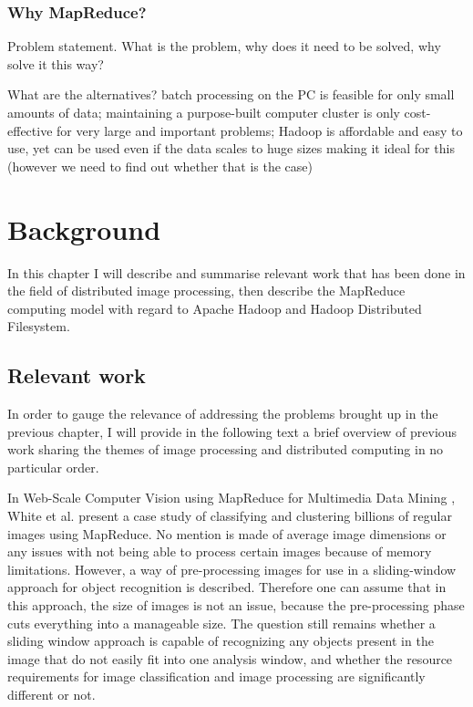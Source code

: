 \documentclass [12pt,a4paper]{report}
\begin{document}

\subsection{Why MapReduce?}

Problem statement. What is the problem, why does it need to be solved, why solve it this way? 

What are the alternatives? batch processing on the PC is feasible for only small amounts of data; maintaining a purpose-built computer cluster is only cost-effective for very large and important problems; Hadoop is affordable and easy to use, yet can be used even if the data scales to huge sizes making it ideal for this (however we need to find out whether that is the case)


\chapter{Background}

In this chapter I will describe and summarise relevant work that has been done in the field of distributed image processing, then describe the MapReduce computing model with regard to Apache Hadoop and Hadoop Distributed Filesystem.

\section{Relevant work}

In order to gauge the relevance of addressing the problems brought up in the previous chapter, I will provide in the following text a brief overview of previous work sharing the themes of image processing and distributed computing in no particular order. 

In Web-Scale Computer Vision using MapReduce for Multimedia Data Mining \cite{White:2010:WCV:1814245.1814254}, White et al. present a case study of classifying and clustering billions of regular images using MapReduce. No mention is made of average image dimensions or any issues with not being able to process certain images because of memory limitations. However, a way of pre-processing images for use in a sliding-window approach for object recognition is described. Therefore one can assume that in this approach, the size of images is not an issue, because the pre-processing phase cuts everything into a manageable size. The question still remains whether a sliding window approach is capable of recognizing any objects present in the image that do not easily fit into one analysis window, and whether the resource requirements for image classification and image processing are significantly different or not.
\end{document}

